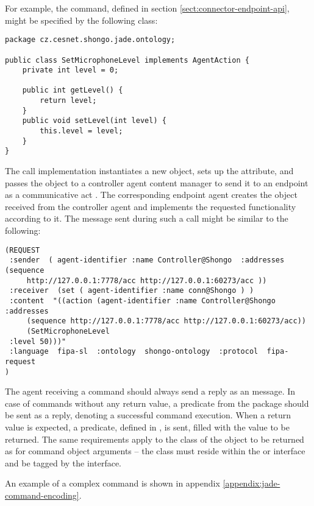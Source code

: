 For example, the  command, defined in section \ref{sect:connector-endpoint-api}, might be specified by the following class:
\begin{verbatim}
package cz.cesnet.shongo.jade.ontology;

public class SetMicrophoneLevel implements AgentAction {
    private int level = 0;

    public int getLevel() {
        return level;
    }
    public void setLevel(int level) {
        this.level = level;
    }
}
\end{verbatim}
The  call implementation instantiates a new  object, sets up the  attribute, and passes the object to a controller agent content manager to send it to an endpoint as a  communicative act \cite{FIPA-ComActSpec}. The corresponding endpoint agent creates the  object received from the controller agent and implements the requested functionality according to it. The message sent during such a call might be similar to the following:
\begin{verbatim}
(REQUEST
 :sender  ( agent-identifier :name Controller@Shongo  :addresses (sequence
     http://127.0.0.1:7778/acc http://127.0.0.1:60273/acc ))
 :receiver  (set ( agent-identifier :name conn@Shongo ) )
 :content  "((action (agent-identifier :name Controller@Shongo :addresses
     (sequence http://127.0.0.1:7778/acc http://127.0.0.1:60273/acc))
     (SetMicrophoneLevel
 :level 50)))"
 :language  fipa-sl  :ontology  shongo-ontology  :protocol  fipa-request
)
\end{verbatim}

The agent receiving a command should always send a reply as an  \cite{FIPA-ComActSpec} message. In case of commands without any return value, a  predicate from the package  should be sent as a reply, denoting a successful command execution. When a return value is expected, a  predicate, defined in \cite{FIPA-SL}, is sent, filled with the value to be returned. The same requirements apply to the class of the object to be returned as for command object arguments -- the class must reside within the  or  interface and be tagged by the  interface.

An example of a complex command is shown in appendix \ref{appendix:jade-command-encoding}.




